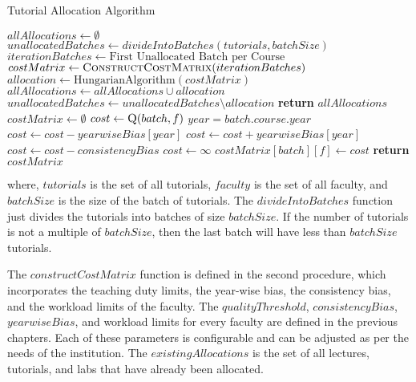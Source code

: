 \begin{algorithm}[H]
  \caption{Tutorial Allocation Algorithm}
  \begin{algorithmic}
    \State $allAllocations \gets \emptyset$
    \State $unallocatedBatches \gets divideIntoBatches(tutorials, batchSize)$
    \State $iterationBatches \gets \text{First Unallocated Batch per Course}$
    \State $costMatrix \gets \Call{ConstructCostMatrix}{iterationBatches}$
    \State $allocation \gets \text{HungarianAlgorithm}(costMatrix)$
    \State $allAllocations \gets allAllocations \cup allocation$
    \State $unallocatedBatches \gets unallocatedBatches \setminus allocation$
    \EndWhile
    \State \textbf{return} $allAllocations$
    \EndProcedure
    \\
    \State $costMatrix \gets \emptyset$
    \State $cost \gets \Call{Q}{batch, f}$
    \State $year = batch.course.year$
    \State $cost \gets cost - yearwiseBias[year]$
    \Else
    \State $cost \gets cost + yearwiseBias[year]$
    \EndIf
    \State $cost \gets cost - consistencyBias$
    \EndIf
    \State $cost \gets \infty$
    \EndIf
    \State $costMatrix[batch][f] \gets cost$
    \EndFor
    \EndFor
    \State \textbf{return} $costMatrix$
    \EndProcedure
  \end{algorithmic}
  \label{alg:tutorial_allocation}
\end{algorithm}

where, $tutorials$ is the set of all tutorials, $faculty$ is the set of all faculty, and $batchSize$ is the size of the batch of tutorials. The $divideIntoBatches$ function just divides the tutorials into batches of size $batchSize$. If the number of tutorials is not a multiple of $batchSize$, then the last batch will have less than $batchSize$ tutorials.

The $constructCostMatrix$ function is defined in the second procedure, which incorporates the teaching duty limits, the year-wise bias, the consistency bias, and the workload limits of the faculty. The $qualityThreshold$, $consistencyBias$, $yearwiseBias$, and workload limits for every faculty are defined in the previous chapters. Each of these parameters is configurable and can be adjusted as per the needs of the institution. The $existingAllocations$ is the set of all lectures, tutorials, and labs that have already been allocated.

